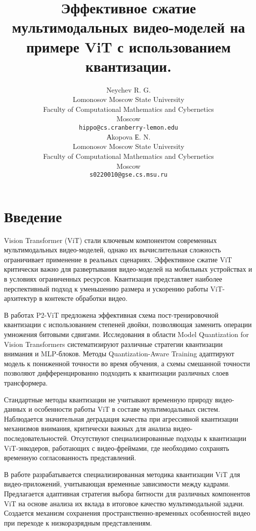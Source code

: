 \documentclass{article}
\title{Эффективное сжатие мультимодальных видео-моделей на примере ViT с использованием квантизации.}
\author{Neychev R. G.\\
	Lomonosov Moscow State University\\
	Faculty of Computational Mathematics and Cybernetics\\
	Moscow \\
	\texttt{hippo@cs.cranberry-lemon.edu} \\
	\And
	Аkopova Е. N.\\
	Lomonosov Moscow State University\\
	Faculty of Computational Mathematics and Cybernetics\\
	Moscow\\
	\texttt{s0220010@gse.cs.msu.ru} \\
}
\date{}
\begin{document}
\maketitle

\begin{abstract}

\end{abstract}


\newpage
\section{Введение}

Vision Transformer (ViT) стали ключевым компонентом современных мультимодальных видео-моделей, однако их вычислительная сложность ограничивает применение в реальных сценариях. Эффективное сжатие ViT критически важно для развертывания видео-моделей на мобильных устройствах и в условиях ограниченных ресурсов. Квантизация представляет наиболее перспективный подход к уменьшению размера и ускорению работы ViT-архитектур в контексте обработки видео.

В работах P2-ViT предложена эффективная схема пост-тренировочной квантизации с использованием степеней двойки, позволяющая заменить операции умножения битовыми сдвигами. Исследования в области Model Quantization for Vision Transformers систематизируют различные стратегии квантизации внимания и MLP-блоков. Методы Quantization-Aware Training адаптируют модель к пониженной точности во время обучения, а схемы смешанной точности позволяют дифференцированно подходить к квантизации различных слоев трансформера.

Стандартные методы квантизации не учитывают временную природу видео-данных и особенности работы ViT в составе мультимодальных систем. Наблюдается значительная деградация качества при агрессивной квантизации механизмов внимания, критически важных для анализа видео-последовательностей. Отсутствуют специализированные подходы к квантизации ViT-энкодеров, работающих с видео-фреймами, где необходимо сохранять временную согласованность представлений.

В работе разрабатывается специализированная методика квантизации ViT для видео-приложений, учитывающая временные зависимости между кадрами. Предлагается адаптивная стратегия выбора битности для различных компонентов ViT на основе анализа их вклада в итоговое качество мультимодальной задачи. Создается механизм сохранения пространственно-временных особенностей видео при переходе к низкоразрядным представлениям.
\end{document}
